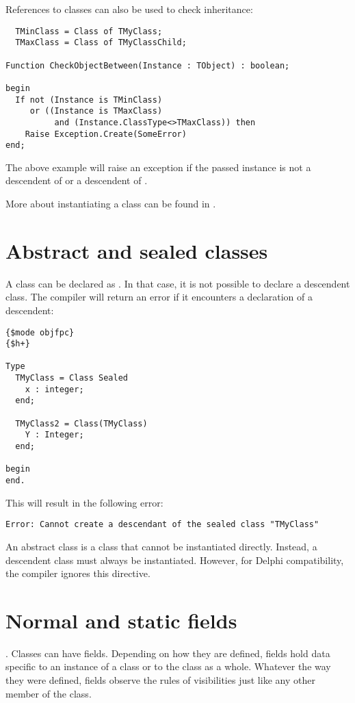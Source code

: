 References to classes can also be used to check inheritance:
\begin{verbatim}
  TMinClass = Class of TMyClass;
  TMaxClass = Class of TMyClassChild;

Function CheckObjectBetween(Instance : TObject) : boolean;

begin
  If not (Instance is TMinClass) 
     or ((Instance is TMaxClass) 
          and (Instance.ClassType<>TMaxClass)) then
    Raise Exception.Create(SomeError)
end;
\end{verbatim}
The above example will raise an exception if the passed instance
is not a descendent of  or a descendent of .

More about instantiating a class can be found in .

\section{Abstract and sealed classes}
A class can be declared as . In that case, it is not possible to
declare a descendent class. The compiler will return an error if it
encounters a declaration of a descendent:
\begin{verbatim}
{$mode objfpc}
{$h+}

Type
  TMyClass = Class Sealed
    x : integer;
  end;

  TMyClass2 = Class(TMyClass)
    Y : Integer;
  end;

begin
end. 
\end{verbatim}
This will result in the following error:
\begin{verbatim}
Error: Cannot create a descendant of the sealed class "TMyClass"
\end{verbatim}

An abstract class is a class that cannot be instantiated directly. Instead,
a descendent class must always be instantiated. 
However, for Delphi compatibility, the compiler ignores this directive.

\section{Normal and static fields}
\label{se:classfields}.
Classes can have fields. Depending on how they are defined, fields hold data specific to 
an instance of a class or to the class as a whole. Whatever the way they were defined, 
fields observe the rules of visibilities just like any other member of the class.

